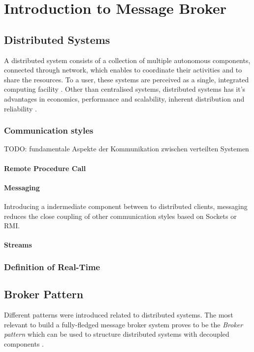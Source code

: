 \chapter{Introduction to Message Broker}
\section{Distributed Systems}
A distributed system consists of a collection of multiple autonomous components,
connected through network, which enables to coordinate their activities and to
share the resources. To a user, these systems are perceived as a single,
integrated computing facility \cite{TAN06}. Other than centralised systems,
distributed systems has it's advantages in economics, performance and
scalability, inherent distribution and reliability \cite{POSA1}.

\subsection{Communication styles}
TODO: fundamentale Aspekte der Kommunikation zwischen verteilten Systemen

\subsubsection{Remote Procedure Call}

\subsubsection{Messaging}
Introducing a indermediate component between to distributed clients, messaging
reduces the close coupling of other communication styles based on Sockets or RMI.

\subsubsection{Streams}

\subsection{Definition of Real-Time}

\section{Broker Pattern}
Different patterns were introduced related to distributed systems. The most
relevant to build a fully-fledged message broker system proves to be the
\textit{Broker pattern} which can be used to structure distributed systems with
decoupled components \cite{POSA1}. 

